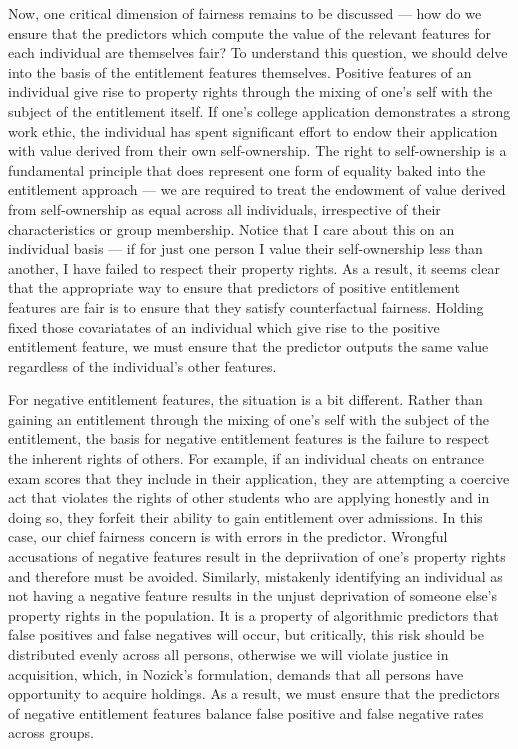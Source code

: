 Now, one critical dimension of fairness remains to be discussed — how do we
ensure that the predictors which compute the value of the relevant features for
each individual are themselves fair? To understand this question, we should
delve into the basis of the entitlement features themselves. Positive features
of an individual give rise to property rights through the mixing of one's self 
with the subject of the entitlement itself. If one's college application
demonstrates a strong work ethic, the individual has spent significant effort to
endow their application with value derived from their own self-ownership. The
right to self-ownership is a fundamental principle that does represent one form
of equality baked into the entitlement approach — we are required to treat the 
endowment of value derived from self-ownership as equal across all individuals,
irrespective of their characteristics or group membership. Notice that I care 
about this on an individual basis — if for just one person I value their
self-ownership less than another, I have failed to respect their property 
rights. As a result, it seems clear that the appropriate way to ensure that 
predictors of positive entitlement features are fair is to ensure that they
satisfy counterfactual fairness. Holding fixed those covariatates of an
individual which give rise to the positive entitlement feature, we must ensure
that the predictor outputs the same value regardless of the individual's other
features.

For negative entitlement features, the situation is a bit different. Rather than
gaining an entitlement through the mixing of one's self with the subject of the
entitlement, the basis for negative entitlement features is the failure to
respect the inherent rights of others. For example, if an individual cheats on
entrance exam scores that they include in their application, they are attempting
a coercive act that violates the rights of other students who are applying
honestly and in doing so, they forfeit their ability to gain entitlement over
admissions. In this case, our chief fairness concern is with errors in the
predictor. Wrongful accusations of negative features result in the depriivation
of one's property rights and therefore must be avoided. Similarly, mistakenly
identifying an individual as not having a negative feature results in the 
unjust deprivation of someone else's property rights in the population. It is a
property of algorithmic predictors that false positives and false negatives will
occur, but critically, this risk should be distributed evenly across all persons,
otherwise we will violate justice in acquisition, which, in Nozick's formulation,
demands that all persons have opportunity to acquire holdings. As a result,
we must ensure that the predictors of negative entitlement features balance 
false positive and false negative rates across groups.


